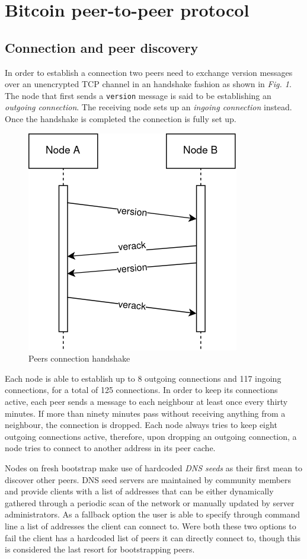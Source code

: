 \documentclass[12pt, letterpaper, twoside]{article}
\title{}
\author{}
\begin{document}
\maketitle

\section{Bitcoin peer-to-peer protocol}\label{netintro}
\subsection{Connection and peer discovery}\label{peerdisc}
In order to establish a connection two peers need to exchange version messages over an unencrypted TCP channel in an handshake fashion as shown in \emph{Fig. 1}. The node that first sends a \texttt{version} message is said to be establishing an \emph{outgoing connection}. The receiving node sets up an \emph{ingoing connection} instead. Once the handshake is completed the connection is fully set up.

\begin{figure}[h]
	\includegraphics[width=.45\textwidth]{pict/BTCconnection.png}
	\centering
	\caption{Peers connection handshake}
\end{figure}

Each node is able to establish up to 8 outgoing connections and 117 ingoing connections, for a total of 125 connections. In order to keep its connections active, each peer sends a message to each neighbour at least once every thirty minutes. If more than ninety minutes pass without receiving anything from a neighbour, the connection is dropped. Each node always tries to keep eight outgoing connections active, therefore, upon dropping an outgoing connection, a node tries to connect to another address in its peer cache.

Nodes on fresh bootstrap make use of hardcoded \emph{DNS seeds} as their first mean to discover other peers. DNS seed servers are maintained by community members and provide clients with a list of addresses that can be either dynamically gathered through a periodic scan of the network or manually updated by server administrators. As a fallback option the user is able to specify through command line a list of addresses the client can connect to. Were both these two options to fail the client has a hardcoded list of peers it can directly connect to, though this is considered the last resort for bootstrapping peers.
\end{document}
